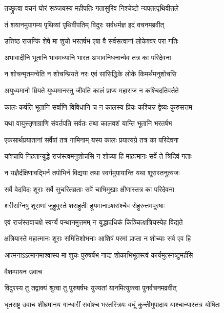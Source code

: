 \twolineshloka
{तच्छ्रुत्वा वचनं घोरं सञ्जयस्य महीपतिः}
{गतासुरिव निश्चेष्टो न्यपतत्पृथिवीतले}


\twolineshloka
{तं शयानमुपागम्य पृथिव्यां पृथिवीपतिम्}
{विदुरः सर्वधर्मज्ञ इदं वचनमब्रवीत्}


\twolineshloka
{उत्तिष्ठ राजन्किं शेषे मा शुचो भरतर्षभ}
{एषा वै सर्वसत्वानां लोकेश्वर परा गतिः}


\twolineshloka
{अभावादीनि भूतानि भावमध्यानि भारत}
{अभावनिधनान्येव तत्र का परिदेवना}


\twolineshloka
{न शोचन्मृतमन्वेति न शोचन्म्रियते नरः}
{एवं सांसिद्धिके लोके किमर्थमनुशोचसि}


\twolineshloka
{अयुध्यमानो म्रियते युध्यमानस्तु जीवति}
{कालं प्राप्य महाराज न कश्चिदतिवर्तते}


\twolineshloka
{कालः कर्षति भूतानि सर्वाणि विविधानि च}
{न कालस्य प्रियः कश्चिन्न द्वेष्यः कुरुसत्तम}


\twolineshloka
{यथा वायुस्तृणाग्राणि संवर्तपति सर्वतः}
{तथा कालवशं यान्ति भूतानि भरतर्षभ}


\twolineshloka
{एकसार्थप्रयातानां सर्वेषां तत्र गामिनाम्}
{यस्य कालः प्रयात्यग्रे तत्र का परिदेवना}


\twolineshloka
{यांश्चापि निहतान्युद्धे राजंस्त्वमनुशोचसि}
{न शोच्या हि माहत्मानः सर्वे ते त्रिदिवं गताः}


\twolineshloka
{न यज्ञैर्दक्षिणावद्भिर्न तपोभिर्न विद्यया}
{तथा स्वर्गमुपायान्ति यथा शूरास्तनुत्यजः}


\twolineshloka
{सर्वे वेदविदः शूराः सर्वे सुचरितव्रताः}
{सर्वे चाभिमुखाः क्षीणास्तत्र का परिदेवना}


\twolineshloka
{शरीराग्निषु शूराणां जुहुवुस्ते शराहुतीः}
{हूयमानाञ्शरांश्चैव सेहुरुत्तमपूरषाः}


\twolineshloka
{एवं राजंस्तवाचक्षे स्वर्ग्यं पन्थानमुत्तमम्}
{न युद्धादधिकं किञ्चित्क्षत्रियस्येह विद्यते}


\twolineshloka
{क्षत्रियास्ते महात्मानः शूराः समितिशोभनाः}
{आशिषं परमां प्राप्ता न शोच्याः सर्व एव हि}


\twolineshloka
{आत्मनाऽऽत्मानमाश्वास्य मा शुचः पुरुषर्षभ}
{नाद्य शोकाभिभूतस्त्वं कार्यमुत्स्नष्टुमर्हसि}


\twolineshloka
{वैशम्पायन उवाच}
{}


\twolineshloka
{विदुरस्य तु तद्वाक्यं श्रुत्वा तु पुरुषर्षभः}
{युज्यतां यानमित्युक्त्वा पुनर्वचनमव्रवीत्}


\threelineshloka
{धृतराष्ट्र उवाच}
{शीघ्रमानय गान्धारीं सर्वाश्च भरतस्त्रियः}
{वधूं कुन्तीमुपादाय याश्चान्यास्तत्र योषितः}


